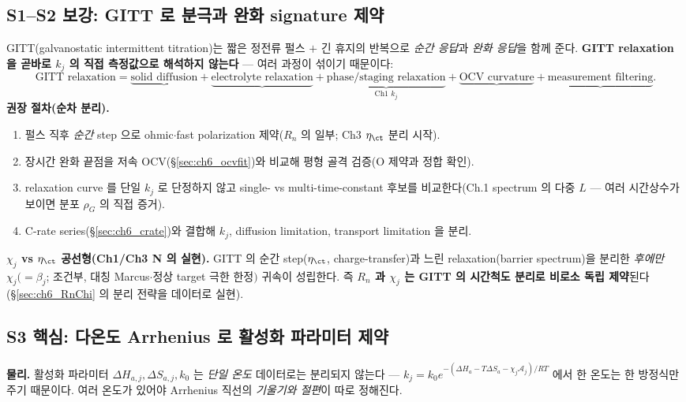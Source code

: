 \subsection{S1--S2 보강: GITT 로 분극과 완화 signature 제약}\label{sec:ch6_gittfit}
GITT(galvanostatic intermittent titration)는 짧은 정전류 펄스 $+$ 긴 휴지의 반복으로 \emph{순간 응답}과 \emph{완화
응답}을 함께 준다. \textbf{GITT relaxation 을 곧바로 $k_j$ 의 직접 측정값으로 해석하지 않는다} — 여러 과정이
섞이기 때문이다:
\begin{equation}
\text{GITT relaxation}=\underbrace{\text{solid diffusion}}_{}+\underbrace{\text{electrolyte relaxation}}_{}+
\underbrace{\text{phase/staging relaxation}}_{\text{Ch1 }k_j}+\underbrace{\text{OCV curvature}}_{}+\underbrace{\text{measurement filtering}}_{}.
\label{eq:ch6_gitt_decomp}
\end{equation}
\textbf{권장 절차(순차 분리).}
\begin{enumerate}[label=G\arabic*),leftmargin=2.4em]
\item 펄스 직후 \emph{순간} step 으로 ohmic$\cdot$fast polarization 제약($R_n$ 의 일부; Ch3 $\eta_\ct$ 분리 시작).
\item 장시간 완화 끝점을 저속 OCV(\S\ref{sec:ch6_ocvfit})와 비교해 평형 골격 검증(O 제약과 정합 확인).
\item relaxation curve 를 단일 $k_j$ 로 단정하지 않고 single- vs multi-time-constant 후보를 비교한다(Ch.1
  spectrum 의 다중 $L$ — 여러 시간상수가 보이면 분포 $\rho_G$ 의 직접 증거).
\item C-rate series(\S\ref{sec:ch6_crate})와 결합해 $k_j$, diffusion limitation, transport limitation 을 분리.
\end{enumerate}
\textbf{$\chi_j$ vs $\eta_\ct$ 공선형(Ch1/Ch3 N 의 실현).} GITT 의 순간 step($\eta_\ct$, charge-transfer)과 느린
relaxation(barrier spectrum)을 분리한 \emph{후에만} $\chi_j(=\beta_j$; 조건부, 대칭 Marcus$\cdot$정상 target 극한 한정$)$ 귀속이 성립한다. 즉 \textbf{$R_n$ 과 $\chi_j$
는 GITT 의 시간척도 분리로 비로소 독립 제약}된다(\S\ref{sec:ch6_RnChi} 의 분리 전략을 데이터로 실현).

\subsection{S3 핵심: 다온도 Arrhenius 로 활성화 파라미터 제약}\label{sec:ch6_arrhenius}
\textbf{물리.} 활성화 파라미터 $\Delta H_{a,j},\Delta S_{a,j},k_0$ 는 \emph{단일 온도} 데이터로는 분리되지 않는다 —
$k_j=k_0 e^{-(\Delta H_a-T\Delta S_a-\chi_j\mathcal A_j)/RT}$ 에서 한 온도는 한 방정식만 주기 때문이다. 여러 온도가
있어야 Arrhenius 직선의 \emph{기울기와 절편}이 따로 정해진다.


